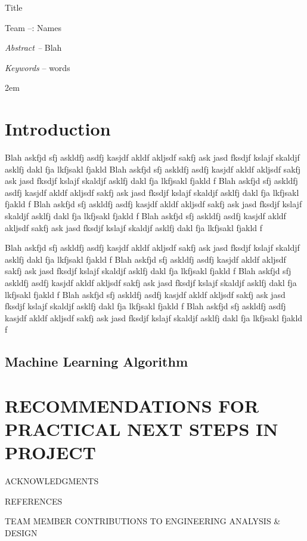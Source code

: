 \documentclass[11pt]{article}
\date{}
\begin{document}
{
\centering
{\Large Title}

}

Team --: Names

\emph{Abstract --} Blah 

\emph{Keywords} -- words

\parindent 2em

\section{Introduction}
	
	Blah askfjd sfj askldfj asdfj kasjdf akldf akljsdf sakfj ask jasd fksdjf kslajf skaldjf asklfj dakl fja lkfjsakl fjakld 	Blah askfjd sfj askldfj asdfj kasjdf akldf akljsdf sakfj ask jasd fksdjf kslajf skaldjf asklfj dakl fja lkfjsakl fjakld f	Blah askfjd sfj askldfj asdfj kasjdf akldf akljsdf sakfj ask jasd fksdjf kslajf skaldjf asklfj dakl fja lkfjsakl fjakld f	Blah askfjd sfj askldfj asdfj kasjdf akldf akljsdf sakfj ask jasd fksdjf kslajf skaldjf asklfj dakl fja lkfjsakl fjakld f	Blah askfjd sfj askldfj asdfj kasjdf akldf akljsdf sakfj ask jasd fksdjf kslajf skaldjf asklfj dakl fja lkfjsakl fjakld f
	
		Blah askfjd sfj askldfj asdfj kasjdf akldf akljsdf sakfj ask jasd fksdjf kslajf skaldjf asklfj dakl fja lkfjsakl fjakld f	Blah askfjd sfj askldfj asdfj kasjdf akldf akljsdf sakfj ask jasd fksdjf kslajf skaldjf asklfj dakl fja lkfjsakl fjakld f	Blah askfjd sfj askldfj asdfj kasjdf akldf akljsdf sakfj ask jasd fksdjf kslajf skaldjf asklfj dakl fja lkfjsakl fjakld f	Blah askfjd sfj askldfj asdfj kasjdf akldf akljsdf sakfj ask jasd fksdjf kslajf skaldjf asklfj dakl fja lkfjsakl fjakld f	Blah askfjd sfj askldfj asdfj kasjdf akldf akljsdf sakfj ask jasd fksdjf kslajf skaldjf asklfj dakl fja lkfjsakl fjakld f
	
	\subsection{Machine Learning Algorithm}
	
	
\section{RECOMMENDATIONS FOR PRACTICAL NEXT STEPS IN PROJECT}


\centerline{ACKNOWLEDGMENTS}


\renewcommand\refname{\vskip -1cm}
\centerline{REFERENCES}



\newpage

\centerline{TEAM MEMBER CONTRIBUTIONS TO ENGINEERING ANALYSIS \& DESIGN}
\end{document}
